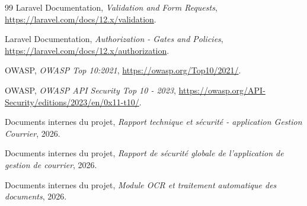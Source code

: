 \begin{thebibliography}{99}
Laravel Documentation, \textit{Validation and Form Requests},
\url{https://laravel.com/docs/12.x/validation}.

Laravel Documentation, \textit{Authorization - Gates and Policies},
\url{https://laravel.com/docs/12.x/authorization}.

OWASP, \textit{OWASP Top 10:2021},
\url{https://owasp.org/Top10/2021/}.

OWASP, \textit{OWASP API Security Top 10 - 2023},
\url{https://owasp.org/API-Security/editions/2023/en/0x11-t10/}.

Documents internes du projet, \textit{Rapport technique et sécurité - application Gestion Courrier}, 2026.

Documents internes du projet, \textit{Rapport de sécurité globale de l'application de gestion de courrier}, 2026.

Documents internes du projet, \textit{Module OCR et traitement automatique des documents}, 2026.

\end{thebibliography}


